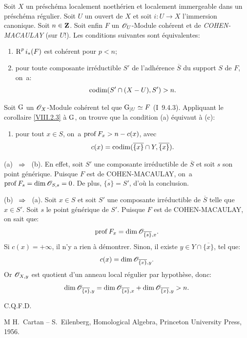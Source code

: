 \begin{proposition} \label{VIII.3.2} Soit $X$ un pr\'esch\'ema localement noeth\'erien et localement immergeable dans un pr\'esch\'ema r\'egulier. Soit $U$ un ouvert de $X$ et soit $i\colon U\to X$ l'immersion canonique. Soit $n\in\mathbf{Z}$. Soit enfin $F$ un ${\mathscr O}_U$-Module coh\'erent et de \emph{COHEN-MACAULAY} (sur $U$!). Les conditions suivantes sont \'equivalentes:
\begin{enumerate}
\item[(a)]
$\operatorname{R}^pi_\ast(F)$ est coh\'erent pour $p<n$;

\item[(b)]
pour toute composante irr\'eductible $S'$ de l'adh\'erence $\overline S$ du support $S$ de $F$, on~a:
\[
\operatorname{codim} (S'\cap (X-U), S')>n.
\]
\end{enumerate}
\end{proposition}

Soit ${\operatorname{G}}$ un $\mathscr{O}_X$-Module coh\'erent tel que ${\operatorname{G}}{}_{|U}\simeq F$ (\EGA I~9.4.3). Appliquant le corollaire \ref{VIII.2.3} \`a ${\operatorname{G}}$, on trouve que la condition (a) \'equivaut \`a (c):
\begin{enumerate}
\item[(c)]
pour tout $x\in S$, on~a $\operatorname{prof} F_x>n-c(x)$, avec
\[c(x)=\operatorname{codim}(\overline{\{x\}}\cap Y, \overline{\{x\}}).
\]
\end{enumerate}

(a) ~$\To$~ (b). En effet, soit $S'$ une composante irr\'eductible de $\overline S$ et soit $s$ son point g\'en\'erique. Puisque $F$ est de COHEN-MACAULAY, on~a $\operatorname{prof} F_s=\dim {\mathscr O}_{S, s}=0$. De plus, $\overline{\{s\}}=S'$, d'o\`u la conclusion.

(b) ~$\To$~ (a). Soit $x\in S$ et soit $S'$ une composante irr\'eductible de $\overline{S}$ telle que $x\in S'$. Soit $s$ le point g\'en\'erique de $S'$. Puisque $F$ est de COHEN-MACAULAY, on sait que:
\[
\operatorname{prof} F_x=\dim {\mathscr O}_{\overline{\{s\}}, x}.
\]
Si $c(x)=+\infty$, il n'y a rien \`a d\'emontrer. Sinon, il existe $y\in Y\cap \overline{\{x\}}$, tel que:
\[c(x)=\dim {\mathscr O}_{\overline{\{x\}}, y}.
\]
Or ${\mathscr O}_{X, y}$ est quotient d'un anneau local r\'egulier par hypoth\`ese, donc:
\[
\dim {\mathscr O}_{\overline{\{s\}}, y}=\dim {\mathscr O}_{\overline{\{s\}}, x} +\dim {\mathscr O}_{\overline{\{x\}}, y}>n.
\]
\begin{flushright}C.Q.F.D.\end{flushright}

\begin{thebibliography}{M}
H.~Cartan -- S.~Eilenberg, Homological Algebra, Princeton University Press, 1956.
\end{thebibliography}

